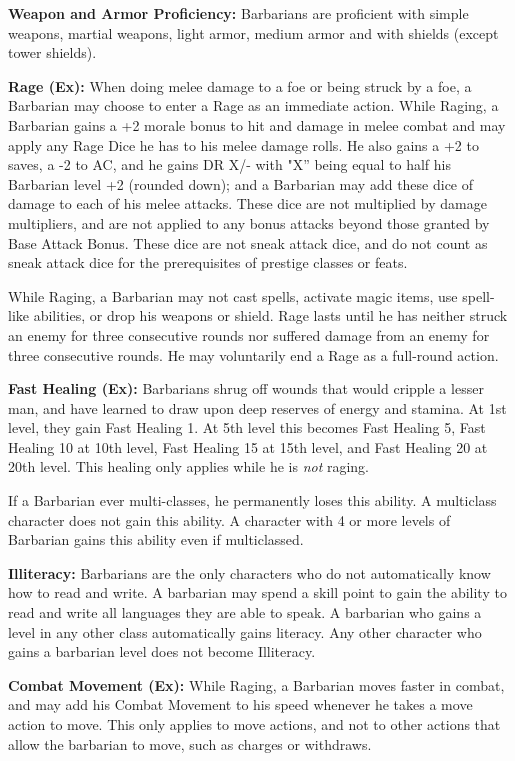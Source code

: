 \classfeatures

\textbf{Weapon and Armor Proficiency:} Barbarians are proficient with simple weapons, martial weapons, light armor, medium armor and with shields (except tower shields).

\textbf{Rage (Ex):} When doing melee damage to a foe or being struck by a foe, a Barbarian may choose to enter a Rage as an immediate action. While Raging, a Barbarian gains a +2 morale bonus to hit and damage in melee combat and may apply any Rage Dice he has to his melee damage rolls. He also gains a +2 to saves, a -2 to AC, and he gains DR X/- with "X'' being equal to half his Barbarian level +2 (rounded down); and a Barbarian may add these dice of damage to each of his melee attacks. These dice are not multiplied by damage multipliers, and are not applied to any bonus attacks beyond those granted by Base Attack Bonus. These dice are not sneak attack dice, and do not count as sneak attack dice for the prerequisites of prestige classes or feats.

While Raging, a Barbarian may not cast spells, activate magic items, use spell-like abilities, or drop his weapons or shield. Rage lasts until he has neither struck an enemy for three consecutive rounds nor suffered damage from an enemy for three consecutive rounds. He may voluntarily end a Rage as a full-round action.

\textbf{Fast Healing (Ex):} Barbarians shrug off wounds that would cripple a lesser man, and have learned to draw upon deep reserves of energy and stamina. At 1st level, they gain Fast Healing 1. At 5th level this becomes Fast Healing 5, Fast Healing 10 at 10th level, Fast Healing 15 at 15th level, and Fast Healing 20 at 20th level. This healing only applies while he is \textit{not} raging.

If a Barbarian ever multi-classes, he permanently loses this ability. A multiclass character does not gain this ability. A character with 4 or more levels of Barbarian gains this ability even if multiclassed.

\textbf{Illiteracy:} Barbarians are the only characters who do not automatically know how to read and write. A barbarian may spend a skill point to gain the ability to read and write all languages they are able to speak. A barbarian who gains a level in any other class automatically gains literacy. Any other character who gains a barbarian level does not become Illiteracy.

\textbf{Combat Movement (Ex):} While Raging, a Barbarian moves faster in combat, and may add his Combat Movement to his speed whenever he takes a move action to move. This only applies to move actions, and not to other actions that allow the barbarian to move, such as charges or withdraws.

